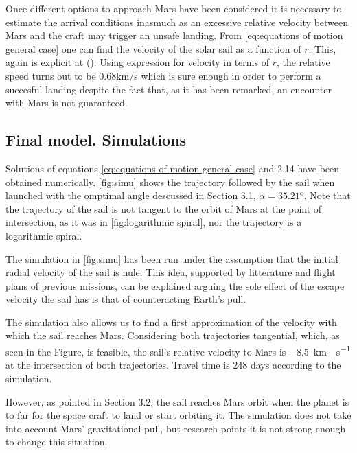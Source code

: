 \documentclass[twocolumn,12pt,a4paper]{article}
\numberwithin{equation}{section}
\begin{document}
Once different options to approach Mars have been considered it is necessary to estimate the arrival conditions inasmuch as an excessive relative velocity between Mars and the craft may trigger an unsafe landing. From \autoref{eq:equations of motion general case} one can find the velocity of the solar sail as a function of $r$. This, again is explicit at (\cite[p. 156]{mcinnes}). Using expression for velocity in terms of $r$, the relative speed turns out to be  $0.68$km/s which is sure enough in order to perform a succesful landing despite the fact that, as it has been remarked, an encounter with Mars is not guaranteed.

\subsection{Final model. Simulations}
Solutions of equations \ref{eq:equations of motion general case} and 2.14 have been obtained numerically. \autoref{fig:simu} shows the trajectory followed by the sail when launched with the omptimal angle descussed in Section 3.1, $\alpha=35.21º$. Note that the trajectory of the sail is not tangent to the orbit of Mars at the point of intersection, as it was in \autoref{fig:logarithmic spiral}, nor the trajectory is a logarithmic spiral.

The simulation in  \autoref{fig:simu} has been run under the assumption that the initial radial velocity of the sail is nule. This idea, supported by litterature and flight plans of previous missions, can be explained arguing the sole effect of the escape velocity the sail has is that of counteracting Earth's pull.

The simulation also allows us to find a first approximation of the velocity with which the sail reaches Mars. Considering both trajectories tangential, which, as seen in the Figure, is feasible, the sail's relative velocity to Mars is \SI{-8,5}{km\cdot s^{-1}} at the intersection of both trajectories. Travel time is 248 days according to the simulation.

However, as pointed in Section 3.2, the sail reaches Mars orbit when the planet is to far for the space craft to land or start orbiting it. The simulation does not take into account Mars' gravitational pull, but research points it is not strong enough to change this situation.
\end{document}
